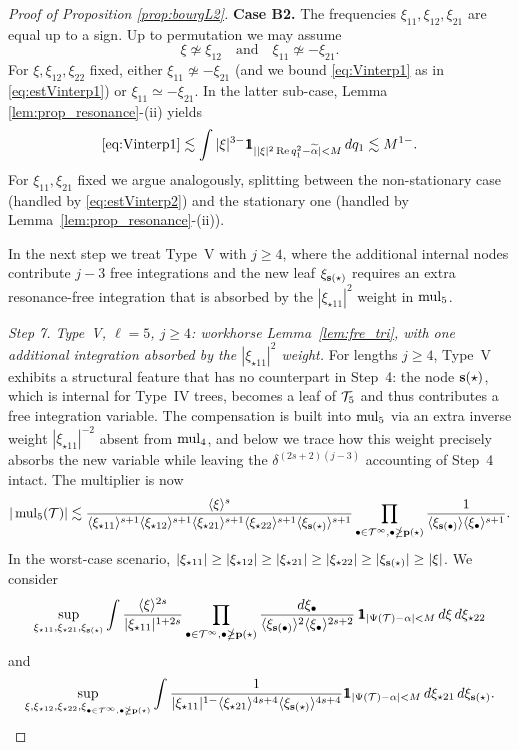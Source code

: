 \begin{proof}[Proof of Proposition \ref{prop:bourgL2}]
\smallskip
\noi\textbf{Case B2.} The frequencies $\xi_{11}, \xi_{12}, \xi_{21}$ are equal up to a sign. Up to permutation we may assume
$$
\xi \not\simeq \xi_{12} \quad \mbox{and}\quad \xi_{11}\not\simeq -\xi_{21}.
$$
For $\xi, \xi_{12}, \xi_{22}$ fixed, either $\xi_{11} \not\simeq -\xi_{21}$ (and we bound \eqref{eq:Vinterp1} as in \eqref{eq:estVinterp1}) or $\xi_{11}\simeq -\xi_{21}$. In the latter sub-case, Lemma \ref{lem:prop_resonance}-(ii) yields
\begin{equation}
\eqref{eq:Vinterp1} \lesssim \int |\xi|^{3-}\ind_{||\xi|^2\Re q_1^2 - \widetilde\alpha|<M} \,dq_1 \lesssim M^{1-}.
\end{equation}
For $\xi_{11}, \xi_{21}$ fixed we argue analogously, splitting between the non-stationary case (handled by \eqref{eq:estVinterp2}) and the stationary one (handled by Lemma~\ref{lem:prop_resonance}-(ii)).

In the next step we treat Type~V with $j\ge 4$, where the additional internal nodes contribute $j-3$ free integrations and the new leaf $\xi_{\mathbf{s}(\star)}$ requires an extra resonance-free integration that is absorbed by the $|\xi_{\star11}|^{2}$ weight in $\operatorname{mul}_5$.

\medskip
\noi\textit{Step 7. Type~V, $\ell=5$, $j\ge 4$: workhorse Lemma~\ref{lem:fre_tri}, with one additional integration absorbed by the $|\xi_{\star 1 1}|^{2}$ weight.}
For lengths $j\ge 4$, Type~V exhibits a structural feature that has no counterpart in Step~4: the node $\mathbf{s}(\star)$, which is internal for Type~IV trees, becomes a leaf of $\mathcal{T}_5$ and thus contributes a free integration variable. The compensation is built into $\operatorname{mul}_5$ via an extra inverse weight $|\xi_{\star 11}|^{-2}$ absent from $\operatorname{mul}_4$, and below we trace how this weight precisely absorbs the new variable while leaving the $\delta^{(2s+2)(j-3)}$ accounting of Step~4 intact.
The multiplier is now
\begin{equation}\label{eq:mul5_high_j}
|\operatorname{mul}_5(\mathcal{T})| \lesssim \frac{\langle \xi \rangle^s}{\langle \xi_{\star11} \rangle^{s+1}\langle \xi_{\star12} \rangle^{s+1}\langle \xi_{\star21} \rangle^{s+1}\langle \xi_{\star22} \rangle^{s+1}\langle \xi_{\mathbf{s}(\star)} \rangle^{s+1}} \prod_{\bullet \in \mathcal{T}^\infty, \bullet\ngeq \mathbf{p}(\star)} \frac{1}{\langle \xi_{\mathbf{s}(\bullet)} \rangle\langle \xi_\bullet \rangle^{s+1}}.
\end{equation}
In the worst-case scenario, $|\xi_{\star11}|\ge|\xi_{\star12}|\ge|\xi_{\star21}|\ge|\xi_{\star22}|\ge|\xi_{\mathbf{s}(\star)}|\ge |\xi|$. We consider
\begin{equation}\label{eq:Vinterp3}
\sup_{\xi_{\star11}, \xi_{\star21}, \xi_{\sbf(\star)}} \int \frac{\jap{\xi}^{2s}}{|\xi_{\star11}|^{1+2s}}\prod_{\bul \in \TT^\infty, \bul\ngeq \pb(\star)} \frac{d\xi_\bul}{\jap{\xi_{\sbf(\bul)}}^2\jap{\xi_\bul}^{2s+2}}\,\ind_{|\Psi(\TT)-\alpha|<M}\,d\xi\, d\xi_{\star22}
\end{equation}
and
\begin{equation}\label{eq:Vinterp4}
\sup_{\xi, \xi_{\star12}, \xi_{\star22}, \xi_{\bul \in \TT^\infty, \bul\ngeq \pb(\star)}} \int \frac{1}{|\xi_{\star11}|^{1-}\jap{\xi_{\star21}}^{4s+4}\jap{\xi_{\sbf(\star)}}^{4s+4}} \ind_{|\Psi(\TT)-\alpha|<M}\, d\xi_{\star21}\,d\xi_{\sbf(\star)}.
\end{equation}


\end{proof}
